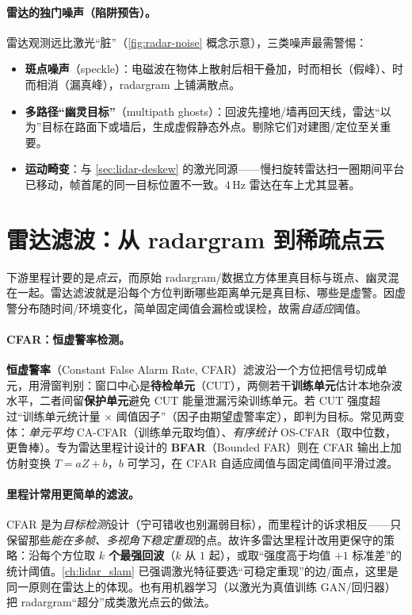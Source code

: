 \paragraph{雷达的独门噪声（陷阱预告）。}
雷达观测远比激光“脏”（\cref{fig:radar-noise} 概念示意），三类噪声最需警惕\cite{carlone2026handbook}：
\begin{itemize}
  \item \textbf{斑点噪声}（speckle）：电磁波在物体上散射后相干叠加，时而相长（假峰）、时而相消（漏真峰），radargram 上铺满散点。
  \item \textbf{多路径“幽灵目标”}（multipath ghosts）：回波先撞地/墙再回天线，雷达“以为”目标在路面下或墙后，生成虚假静态外点。剔除它们对建图/定位至关重要。
  \item \textbf{运动畸变}：与 \cref{sec:lidar-deskew} 的激光同源——慢扫旋转雷达扫一圈期间平台已移动，帧首尾的同一目标位置不一致。$4$\,Hz 雷达在车上尤其显著。
\end{itemize}

\section{雷达滤波：从 radargram 到稀疏点云}
\label{sec:radar-filter}

下游里程计要的是\emph{点云}，而原始 radargram/数据立方体里真目标与斑点、幽灵混在一起。雷达滤波就是沿每个方位判断哪些距离单元是真目标、哪些是虚警。因虚警分布随时间/环境变化，简单固定阈值会漏检或误检，故需\emph{自适应}阈值。

\paragraph{CFAR：恒虚警率检测。}
\textbf{恒虚警率}（Constant False Alarm Rate, CFAR）滤波\cite{carlone2026handbook}沿一个方位把信号切成单元，用滑窗判别：窗口中心是\textbf{待检单元}（CUT），两侧若干\textbf{训练单元}估计本地杂波水平，二者间留\textbf{保护单元}避免 CUT 能量泄漏污染训练单元。若 CUT 强度超过“训练单元统计量 $\times$ 阈值因子”（因子由期望虚警率定），即判为目标。常见两变体：\emph{单元平均} CA-CFAR（训练单元取均值）、\emph{有序统计} OS-CFAR（取中位数，更鲁棒）。专为雷达里程计设计的 \textbf{BFAR}（Bounded FAR）则在 CFAR 输出上加仿射变换 $T=aZ+b$，$b$ 可学习，在 CFAR 自适应阈值与固定阈值间平滑过渡。

\paragraph{里程计常用更简单的滤波。}
CFAR 是为\emph{目标检测}设计（宁可错收也别漏弱目标），而里程计的诉求相反——只保留那些\emph{能在多帧、多视角下稳定重现}的点。故许多雷达里程计改用更保守的策略：沿每个方位取 \textbf{$k$ 个最强回波}（$k$ 从 $1$ 起），或取“强度高于均值 $+1$ 标准差”的统计阈值。\cref{ch:lidar_slam} 已强调激光特征要选“可稳定重现”的边/面点，这里是同一原则在雷达上的体现。也有用机器学习（以激光为真值训练 GAN/回归器）把 radargram“超分”成类激光点云的做法。

